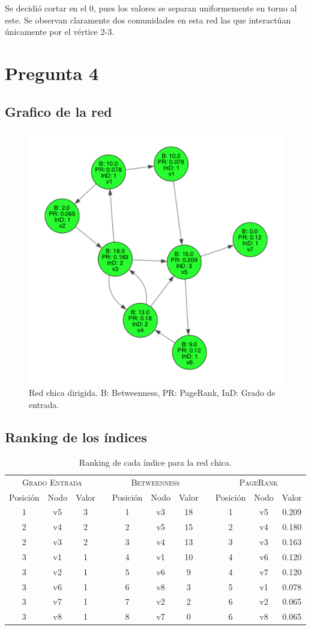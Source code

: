 \documentclass[letterpaper]{article}
\begin{document}
Se decidió cortar en el 0, pues los valores se separan uniformemente en torno al este. Se observan claramente dos comunidades en esta red las que interactúan únicamente por el vértice 2-3.


\section{Pregunta 4}

\subsection{Grafico de la red}
\begin{figure}[H]
  \centering
  \includegraphics[width=.5\linewidth]{img/p4.png}
  \caption{Red chica dirigida. B: Betweenness, PR: PageRank, InD: Grado de entrada.}
  \label{red:4}
\end{figure}

\subsection{Ranking de los índices}
\begin{table}[H]
  \centering
  \renewcommand{\arraystretch}{1.1}
  \begin{tabular}{@{}ccccccccccc@{}}
    \toprule
       \multicolumn{3}{c}{\textsc{Grado Entrada}} & \phantom{abc} & \multicolumn{3}{c}{\textsc{Betweenness}} & \phantom{abc} & \multicolumn{3}{c}{\textsc{PageRank}}\\
       \cmidrule{1-3}\cmidrule{5-7}\cmidrule{9-11}
       Posición & Nodo & Valor & & Posición & Nodo & Valor & & Posición & Nodo & Valor\\
       \midrule
      1 & v5 & 3 &&  1 & v3 & 18 && 1 & v5 & 0.209 \\
      2 & v4 & 2 &&  2 & v5 & 15 && 2 & v4 & 0.180 \\
      2 & v3 & 2 &&  3 & v4 & 13 && 3 & v3 & 0.163 \\
      3 & v1 & 1 &&  4 & v1 & 10 && 4 & v6 & 0.120 \\
      3 & v2 & 1 &&  5 & v6 & 9  && 4 & v7 & 0.120 \\
      3 & v6 & 1 &&  6 & v8 & 3  && 5 & v1 & 0.078 \\
      3 & v7 & 1 &&  7 & v2 & 2  && 6 & v2 & 0.065 \\
      3 & v8 & 1 &&  8 & v7 & 0  && 6 & v8 & 0.065 \\
    \bottomrule
  \end{tabular}
  \caption{Ranking de cada índice para la red chica.}
\end{table}
\end{document}
